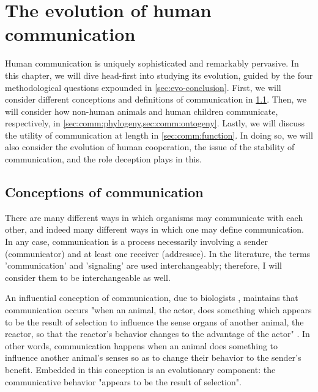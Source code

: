 \chapter{The evolution of human communication}
\label{ch:communication}

Human communication is uniquely sophisticated and remarkably pervasive.
In this chapter, we will dive head-first into studying its evolution, guided by the four methodological questions expounded in \cref{sec:evo-conclusion}.
First, we will consider different conceptions and definitions of communication in \cref{sec:comm:definition}. Then, we will consider how non-human animals and human children communicate, respectively, in \cref{sec:comm:phylogeny,sec:comm:ontogeny}. Lastly, we will discuss the utility of communication at length in \cref{sec:comm:function}. In doing so, we will also consider the evolution of human cooperation, the issue of the stability of communication, and the role deception plays in this.

\section{Conceptions of communication}
\label{sec:comm:definition}

There are many different ways in which organisms may communicate with each other, and indeed many different ways in which one may define communication. In any case, communication is a process necessarily involving a sender (communicator) and at least one receiver (addressee). In the literature, the terms 'communication' and 'signaling' are used interchangeably; therefore, I will consider them to be interchangeable as well.

An influential conception of communication, due to biologists \citet{DawkinsKrebs78}, maintains that communication occurs "when an animal, the actor, does something which appears to be the result of selection to influence the sense organs of another animal, the reactor, so that the reactor's behavior changes to the advantage of the actor" \citep[p.~283]{DawkinsKrebs78}.
In other words, communication happens when an animal does something to influence another animal's senses so as to change their behavior to the sender's benefit.
Embedded in this conception is an evolutionary component: the communicative behavior "appears to be the result of selection".

